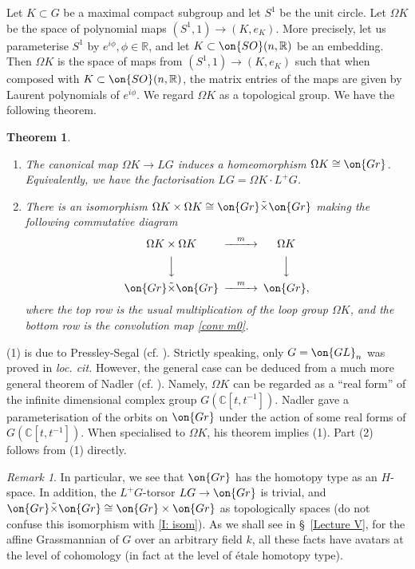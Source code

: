 \documentclass[]{pcmi}
\theoremstyle{plain}
\newtheorem{thm}[equation]{Theorem}
\theoremstyle{remark}
\newtheorem{rmk}[equation]{Remark}
\theoremstyle{definition}
\newcommand{\bC}{{\mathbb C}}
\newcommand{\bR}{{\mathbb R}}
\newcommand{\Gr}{{\on{Gr}}}
\newcommand{\GL}{{\on{GL}}}
\begin{document}
Let $K\subset G$ be a maximal compact subgroup and let $S^1$ be the unit circle. Let $\Omega K$ be the
space of polynomial maps $(S^1,1)\to (K,e_K)$. More precisely, let
us parameterise $S^1$ by $e^{i\phi}, \phi\in\bR$, and let
$K\subset \on{SO}(n,\bR)$ be an embedding. Then $\Omega K$ is the
space of maps from $(S^1,1)\to (K,e_K)$ such that when composed
with $K\subset \on{SO}(n,\bR)$, the matrix entries of the maps are given by
Laurent polynomials of $e^{i\phi}$. We regard $\Omega K$ as a topological group.
We have the following theorem.
\begin{thm}\label{top triv}~
\begin{enumerate}
\item The canonical map $\Omega K\to LG$ induces a homeomorphism $\Omega K\cong \Gr$. Equivalently, we have the factorisation $LG=\Omega K\cdot L^+G$.

\item There is an isomorphism $\Omega K\times\Omega K\cong \Gr\tilde\times\Gr$ making the following commutative diagram
\[\begin{CD}
\Omega K\times \Omega K@>m>>\Omega K\\
@VVV@VVV\\
\Gr\tilde\times\Gr @>m>>\Gr,
\end{CD}\]
where the top row is the usual multiplication of the loop group $\Omega K$, and the bottom row is the convolution map \eqref{conv m0}.
\end{enumerate}
\end{thm}
(1) is due to Pressley-Segal (cf. \cite[\S\ 8.3]{PS}). Strictly speaking, only $G=\GL_n$ was proved in \emph{loc. cit.} However, the general case can be deduced from a much more general theorem of Nadler (cf. \cite[\S\ 4]{Na}).
Namely, $\Omega K$ can be regarded as a ``real form'' of the infinite dimensional complex group $G(\bC[t,t^{-1}])$.  Nadler gave a parameterisation of the orbits on $\Gr$ under the action of some real forms of $G(\bC[t,t^{-1}])$. When specialised to $\Omega K$, his theorem implies (1).
Part (2) follows from (1) directly. 
\begin{rmk}
In particular, we see that $\Gr$ has the homotopy type as an $H$-space. In addition, the $L^+G$-torsor $LG\to \Gr$ is trivial, and $\Gr\tilde\times\Gr\cong \Gr\times\Gr$ as topologically spaces  (do not confuse this isomorphism with \eqref{I: isom}). As we shall see in \S\ \ref{Lecture V}, for the affine Grassmannian of $G$ over an arbitrary field $k$, all these facts have avatars at the level of cohomology (in fact at the level of \'etale homotopy type).
\end{rmk}
\end{document}
